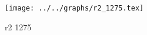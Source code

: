 \begin{figure}[h] \centering \texttt{[image: ../../graphs/r2\_1275.tex]}\caption{r2 1275}\label{gr:r2_1275} \end{figure}
